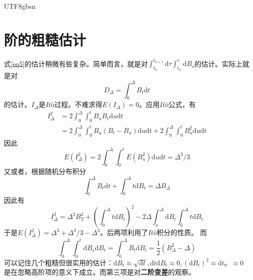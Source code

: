 \documentclass{article}
\begin{document}
\begin{CJK*}{UTF8}{gbsn}
\section{阶的粗糙估计\label{AppendixA}}
式\ref{eq5}的估计稍微有些复杂。简单而言，就是对$\int_{t_n}^{t_{n+1}}\mathrm{d}\tau\int_{t_n}^\tau\mathrm{d}B_s$的估计。实际上就是对
$$
D_\Delta=\int_{0}^{\Delta} B_t\mathrm{d}t
$$
的估计。$I_\Delta$是$It\hat{o}$过程。不难求得$E(I_\Delta)=0$。应用$It\hat{o}$公式，有
$$\begin{aligned}
I_\Delta^2
&=2\int_0^\Delta\int_0^tB_uB_t\mathrm{d}u\mathrm{d}t\\
&=2\int^\Delta_0\int_0^t B_u(B_t-B_u)\mathrm{d}u\mathrm{d}t+2\int^\Delta_0\int_0^t B_u^2\mathrm{d}u\mathrm{d}t
\end{aligned}$$
因此
$$
E(I_\Delta^2)=2\int^\Delta_0\int_0^t E(B_u^2)\mathrm{d}u\mathrm{d}t=\Delta^3/3
$$
又或者，根据随机分布积分
$$
\int_0^\Delta B_t\mathrm{d}t+\int_0^\Delta t\mathrm{d}B_t=\Delta B_\Delta
$$
因此有
$$
I_\Delta^2=\Delta^2B_T^2+(\int_0^\Delta t\mathrm{d}B_t)^2-2\Delta\int_o^\Delta\mathrm{d}B_t\int_0^\Delta t\mathrm{d}B_t
$$
于是$E(I_\Delta^2)=\Delta^3+\Delta^3/3-\Delta^3$。后两项利用了$It\hat{o}$积分的性质。
而
$$
\int_0^\Delta\int_0^t\mathrm{d}B_s\mathrm{d}B_t=\int_0^\Delta B_t\mathrm{d}B_t=\frac{1}{2}(B_\Delta^2-\Delta)
$$
可以记住几个粗糙但很实用的估计：$\mathrm{d}B_t\approx\sqrt{\mathrm{d}t},\mathrm{d}t\mathrm{d}B_t\approx0,(\mathrm{d}B_t)^2\approx\mathrm{d}t$。$\approx0$是在忽略高阶项的意义下成立。而第三项是对\textbf{二阶变差}的观察。
\printbibliography
\end{CJK*}
\end{document}
